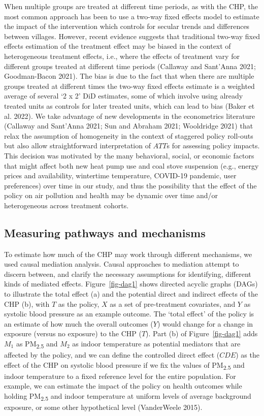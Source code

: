 \documentclass[
  letterpaper,
  DIV=11,
  numbers=noendperiod]{scrartcl}
\begin{document}
When multiple groups are treated at different time periods, as with the
CHP, the most common approach has been to use a two-way fixed effects
model to estimate the impact of the intervention which controls for
secular trends and differences between villages. However, recent
evidence suggests that traditional two-way fixed effects estimation of
the treatment effect may be biased in the context of heterogeneous
treatment effects, i.e., where the effects of treatment vary for
different groups treated at different time periods (Callaway and
Sant'Anna 2021; Goodman-Bacon 2021). The bias is due to the fact that
when there are multiple groups treated at different times the two-way
fixed effects estimate is a weighted average of several `2 x 2' DiD
estimates, some of which involve using already treated units as controls
for later treated units, which can lead to bias (Baker et al. 2022). We
take advantage of new developments in the econometrics literature
(Callaway and Sant'Anna 2021; Sun and Abraham 2021; Wooldridge 2021)
that relax the assumption of homogeneity in the context of staggered
policy roll-outs but also allow straightforward interpretation of
\(ATT\)s for assessing policy impacts. This decision was motivated by
the many behavioral, social, or economic factors that might affect both
new heat pump use and coal stove suspension (e.g., energy prices and
availability, wintertime temperature, COVID-19 pandemic, user
preferences) over time in our study, and thus the possibility that the
effect of the policy on air pollution and health may be dynamic over
time and/or heterogeneous across treatment cohorts.

\subsection{Measuring pathways and
mechanisms}\label{measuring-pathways-and-mechanisms}

To estimate how much of the CHP may work through different mechanisms,
we used causal mediation analysis. Causal approaches to mediation
attempt to discern between, and clarify the necessary assumptions for
identifying, different kinds of mediated effects. Figure~\ref{fig-dag1}
shows directed acyclic graphs (DAGs) to illustrate the total effect (a)
and the potential direct and indirect effects of the CHP (b), with \(T\)
as the policy, \(X\) as a set of pre-treatment covariates, and \(Y\) as
systolic blood pressure as an example outcome. The `total effect' of the
policy is an estimate of how much the overall outcomes
(\(Y\)) would change for a change in exposure (versus no exposure) to
the CHP (\(T\)). Part (b) of Figure~\ref{fig-dag1} adds \(M_{1}\) as
PM\textsubscript{2.5} and \(M_{2}\) as indoor temperature as potential
mediators that are affected by the policy, and we can define the
controlled direct effect (\(CDE\)) as the effect of the CHP on systolic
blood pressure if we fix the values of PM\textsubscript{2.5} and indoor
temperature to a fixed reference level for the entire population. For
example, we can estimate the impact of the policy on health outcomes
while holding PM\textsubscript{2.5} and indoor temperature at uniform
levels of average background exposure, or some other hypothetical level
(VanderWeele 2015).
\end{document}
